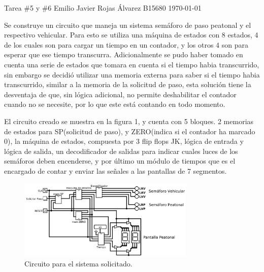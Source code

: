 \documentclass{article}
\begin{document}

\portada
{Tarea \#5 {\large y} \#6}
{Emilio Javier Rojas Álvarez}
{B15680}
{\today}

Se construye un circuito que maneja un sistema semáforo de paso peatonal y el
respectivo vehicular. Para esto se utiliza una máquina de estados con 8 estados,
4 de los cuales son para cargar un tiempo en un contador, y los otros 4 son para
esperar que ese tiempo transcurra. Adicionalmente se pudo haber tomado en cuenta
una serie de estados que tomara en cuenta si el tiempo habia transcurrido, sin
embargo se decidió utilizar una memoria externa para saber si el tiempo habia
transcurrido, similar a la memoria de la solicitud de paso, esta solución tiene
la desventaja de que, sin lógica adicional, no permite deshabilitar el contador
cuando no se necesite, por lo que este está contando en todo momento.

El circuito creado se muestra en la figura 1, y cuenta con 5 bloques. 2 memorias
de estados para SP(solicitud de paso), y ZERO(indica si el contador ha marcado 0),
la máquina de estados, compuesta por 3 flip flops JK, lógica de entrada y lógica
de salida, un decodificador de salidas para indicar cuales luces de los semáforos
deben encenderse, y por último un módulo de tiempos que es el encargado de
contar y enviar las señales a las pantallas de 7 segmentos.

\begin{figure}[H]
  \centering
  \includegraphics[width=0.75\textwidth]{circuito/main.png}
  \caption{Circuito para el sistema solicitado.}
\end{figure}



\end{document}

